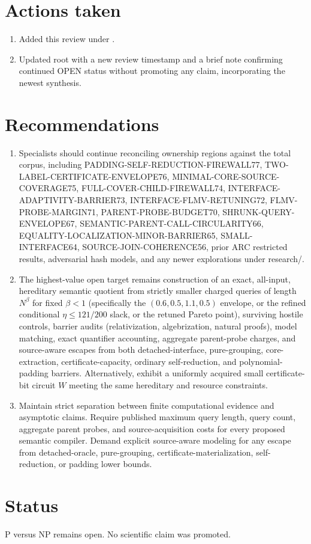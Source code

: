 \documentclass[11pt]{article}
\begin{document}
\section{Actions taken}
\begin{enumerate}
\item Added this review under .
\item Updated root  with a new review timestamp and a brief note confirming continued OPEN status without promoting any claim, incorporating the newest synthesis.
\end{enumerate}

\section{Recommendations}
\begin{enumerate}
\item Specialists should continue reconciling ownership regions against the total corpus, including PADDING-SELF-REDUCTION-FIREWALL77, TWO-LABEL-CERTIFICATE-ENVELOPE76, MINIMAL-CORE-SOURCE-COVERAGE75, FULL-COVER-CHILD-FIREWALL74, INTERFACE-ADAPTIVITY-BARRIER73, INTERFACE-FLMV-RETUNING72, FLMV-PROBE-MARGIN71, PARENT-PROBE-BUDGET70, SHRUNK-QUERY-ENVELOPE67, SEMANTIC-PARENT-CALL-CIRCULARITY66, EQUALITY-LOCALIZATION-MINOR-BARRIER65, SMALL-INTERFACE64, SOURCE-JOIN-COHERENCE56, prior ARC restricted results, adversarial hash models, and any newer explorations under research/.
\item The highest-value open target remains construction of an exact, all-input, hereditary semantic quotient from strictly smaller charged queries of length $N^\beta$ for fixed $\beta<1$ (specifically the $(0.6,0.5,1.1,0.5)$ envelope, or the refined conditional $\eta\le 121/200$ slack, or the retuned Pareto point), surviving hostile controls, barrier audits (relativization, algebrization, natural proofs), model matching, exact quantifier accounting, aggregate parent-probe charges, and source-aware escapes from both detached-interface, pure-grouping, core-extraction, certificate-capacity, ordinary self-reduction, and polynomial-padding barriers. Alternatively, exhibit a uniformly acquired small certificate-bit circuit $W$ meeting the same hereditary and resource constraints.
\item Maintain strict separation between finite computational evidence and asymptotic claims. Require published maximum query length, query count, aggregate parent probes, and source-acquisition costs for every proposed semantic compiler. Demand explicit source-aware modeling for any escape from detached-oracle, pure-grouping, certificate-materialization, self-reduction, or padding lower bounds.
\end{enumerate}

\section{Status}
P versus NP remains open. No scientific claim was promoted.

\end{document}
